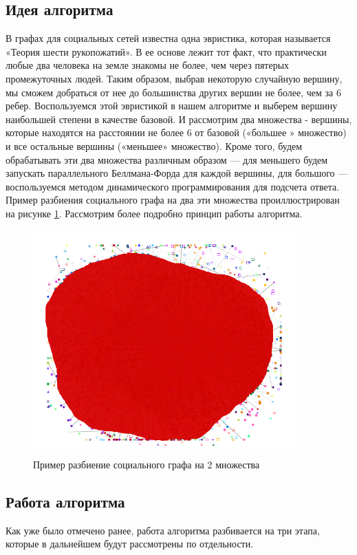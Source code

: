 \FloatBarrier
\subsection{Идея алгоритма}
В графах для социальных сетей известна одна эвристика, которая называется «Теория шести рукопожатий». В ее основе лежит тот факт, что практически любые два человека на земле знакомы не более, чем через пятерых промежуточных людей. Таким образом, выбрав некоторую случайную вершину, мы сможем добраться от нее до большинства других вершин не более, чем за 6 ребер. Воспользуемся этой эвристикой в нашем алгоритме и выберем вершину наибольшей степени в качестве базовой. И рассмотрим два множества - вершины, которые находятся на расстоянии не более 6 от базовой («большее » множество) и все остальные вершины («меньшее» множество). Кроме того, будем обрабатывать эти два множества различным образом --- для меньшего будем запускать параллельного Беллмана-Форда для каждой вершины, для большого --- воспользуемся методом динамического программирования для подсчета ответа. Пример разбиения социального графа на два эти множества проиллюстрирован на рисунке \ref{floyd_social}. Рассмотрим более подробно принцип работы алгоритма.

\begin{figure}[h]
\caption{Пример разбиение социального графа на 2 множества}
\label {floyd_social}
\centering
\includegraphics[width=0.9\textwidth]{img/floyd_social.png}
\end{figure}
\FloatBarrier

\FloatBarrier
\subsection{Работа алгоритма}
Как уже было отмечено ранее, работа алгоритма разбивается на три этапа, которые в дальнейшем будут рассмотрены по отдельности.

